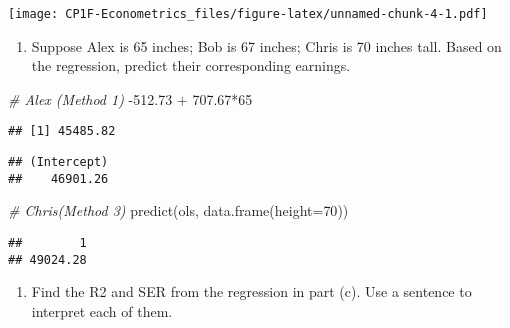 \documentclass[
]{article}
\newenvironment{Shaded}{\begin{snugshade}}{\end{snugshade}}
\newcommand{\AttributeTok}[1]{\textcolor[rgb]{0.77,0.63,0.00}{#1}}
\newcommand{\CommentTok}[1]{\textcolor[rgb]{0.56,0.35,0.01}{\textit{#1}}}
\newcommand{\DecValTok}[1]{\textcolor[rgb]{0.00,0.00,0.81}{#1}}
\newcommand{\FloatTok}[1]{\textcolor[rgb]{0.00,0.00,0.81}{#1}}
\newcommand{\FunctionTok}[1]{\textcolor[rgb]{0.00,0.00,0.00}{#1}}
\newcommand{\NormalTok}[1]{#1}
\newcommand{\SpecialCharTok}[1]{\textcolor[rgb]{0.00,0.00,0.00}{#1}}
\providecommand{\tightlist}{%
  \setlength{\itemsep}{0pt}\setlength{\parskip}{0pt}}
\begin{document}
\texttt{[image: CP1F-Econometrics\_files/figure-latex/unnamed-chunk-4-1.pdf]}

\begin{enumerate}
\def\labelenumi{\alph{enumi})}
\setcounter{enumi}{5}
\tightlist
\item
  Suppose Alex is 65 inches; Bob is 67 inches; Chris is 70 inches tall.
  Based on the regression, predict their corresponding earnings.
\end{enumerate}

\begin{Shaded}
\begin{Highlighting}[]
\CommentTok{\# Alex (Method 1)}
\SpecialCharTok{{-}}\FloatTok{512.73} \SpecialCharTok{+} \FloatTok{707.67}\SpecialCharTok{*}\DecValTok{65}
\end{Highlighting}
\end{Shaded}

\begin{verbatim}
## [1] 45485.82
\end{verbatim}

\begin{Shaded}
\end{Shaded}

\begin{verbatim}
## (Intercept) 
##    46901.26
\end{verbatim}

\begin{Shaded}
\begin{Highlighting}[]
\CommentTok{\# Chris(Method 3)}
\FunctionTok{predict}\NormalTok{(ols, }\FunctionTok{data.frame}\NormalTok{(}\AttributeTok{height=}\DecValTok{70}\NormalTok{))}
\end{Highlighting}
\end{Shaded}

\begin{verbatim}
##        1 
## 49024.28
\end{verbatim}

\begin{enumerate}
\def\labelenumi{\alph{enumi})}
\setcounter{enumi}{6}
\tightlist
\item
  Find the R2 and SER from the regression in part (c). Use a sentence to
  interpret each of them.
\end{enumerate}
\end{document}
